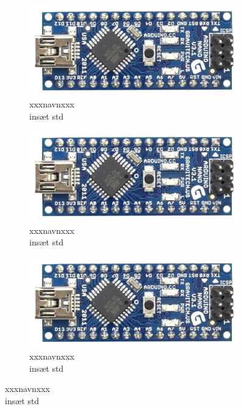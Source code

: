 \begin{titlepage}
\begin{figure}[b!]
    \centering
    \vspace{1mm}
    \begin{subfigure}[1]{0.20\linewidth}
    \includegraphics[width=\linewidth]{Overleaf/Pictures/Frontpage/ardrinon nano.jpg}
    \captionsetup{justification=centering}
    \caption[]{{\small xxxnavnxxx}\\{insæt std}}
    \end{subfigure}
    \hspace{2em}
    \begin{subfigure}[1]{0.20\linewidth}
    \includegraphics[width=\linewidth]{Overleaf/Pictures/Frontpage/ardrinon nano.jpg}
    \captionsetup{justification=centering}
    \caption[]{{\small xxxnavnxxx}\\{insæt std}}
    \end{subfigure}
    \hspace{2em}
    \begin{subfigure}[1]{0.20\linewidth}
    \includegraphics[width=\linewidth]{Overleaf/Pictures/Frontpage/ardrinon nano.jpg}
    \captionsetup{justification=centering}
    \caption[]{{\small xxxnavnxxx}\\{insæt std}}
    \end{subfigure}
    \hspace{2em}
    \vspace{20mm}
\end{figure}
\end{titlepage}